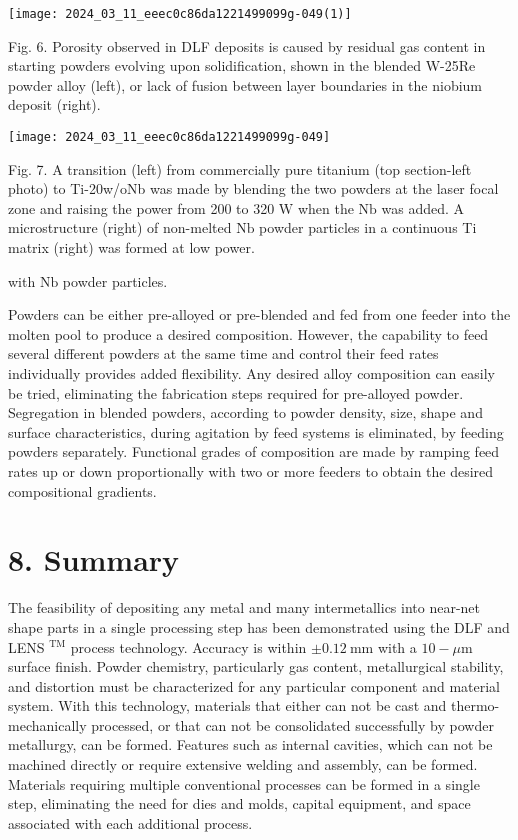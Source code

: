 \documentclass[10pt]{article}
\begin{document}
\begin{center}
\texttt{[image: 2024\_03\_11\_eeec0c86da1221499099g-049(1)]}
\end{center}

Fig. 6. Porosity observed in DLF deposits is caused by residual gas content in starting powders evolving upon solidification, shown in the blended W-25Re powder alloy (left), or lack of fusion between layer boundaries in the niobium deposit (right).

\begin{center}
\texttt{[image: 2024\_03\_11\_eeec0c86da1221499099g-049]}
\end{center}

Fig. 7. A transition (left) from commercially pure titanium (top section-left photo) to Ti-20w/oNb was made by blending the two powders at the laser focal zone and raising the power from 200 to 320 $\mathrm{W}$ when the $\mathrm{Nb}$ was added. A microstructure (right) of non-melted $\mathrm{Nb}$ powder particles in a continuous Ti matrix (right) was formed at low power.

with $\mathrm{Nb}$ powder particles.

Powders can be either pre-alloyed or pre-blended and fed from one feeder into the molten pool to produce a desired composition. However, the capability to feed several different powders at the same time and control their feed rates individually provides added flexibility. Any desired alloy composition can easily be tried, eliminating the fabrication steps required for pre-alloyed powder. Segregation in blended powders, according to powder density, size, shape and surface characteristics, during agitation by feed systems is eliminated, by feeding powders separately. Functional grades of composition are made by ramping feed rates up or down proportionally with two or more feeders to obtain the desired compositional gradients.

\section*{8. Summary}
The feasibility of depositing any metal and many intermetallics into near-net shape parts in a single processing step has been demonstrated using the DLF and LENS $^{\mathrm{TM}}$ process technology. Accuracy is within $\pm 0.12 \mathrm{~mm}$ with a $10-\mu \mathrm{m}$ surface finish. Powder chemistry, particularly gas content, metallurgical stability, and distortion must be characterized for any particular component and material system. With this technology, materials that either can not be cast and thermo-mechanically processed, or that can not be consolidated successfully by powder metallurgy, can be formed. Features such as internal cavities, which can not be machined directly or require extensive welding and assembly, can be formed. Materials requiring multiple conventional processes can be formed in a single step, eliminating the need for dies and molds, capital equipment, and space associated with each additional process.
\end{document}
